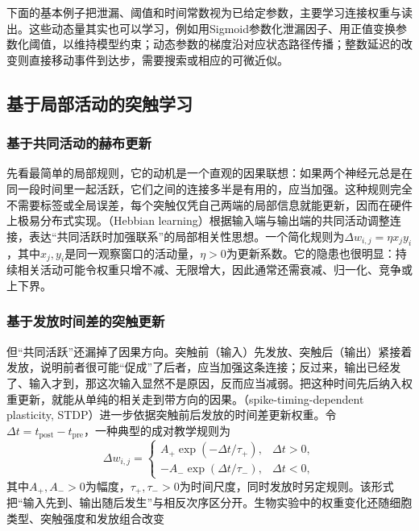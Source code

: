 下面的基本例子把泄漏、阈值和时间常数视为已给定参数，主要学习连接权重与读出。这些动态量其实也可以学习，例如用Sigmoid参数化泄漏因子、用正值变换参数化阈值，以维持模型约束；动态参数的梯度沿对应状态路径传播；整数延迟的改变则直接移动事件到达步，需要搜索或相应的可微近似。

\subsection{基于局部活动的突触学习}
\label{sec:snn-plasticity}

\subsubsection{基于共同活动的赫布更新}
\label{sec:snn-hebb-learning}

先看最简单的局部规则，它的动机是一个直观的因果联想：如果两个神经元总是在同一段时间里一起活跃，它们之间的连接多半是有用的，应当加强。这种规则完全不需要标签或全局误差，每个突触仅凭自己两端的局部信息就能更新，因而在硬件上极易分布式实现。（Hebbian learning）根据输入端与输出端的共同活动调整连接，表达“共同活跃时加强联系”的局部相关性思想。一个简化规则为$\Delta w_{i,j}=\eta x_jy_i$，其中$x_j,y_i$是同一观察窗口的活动量，$\eta>0$为更新系数。它的隐患也很明显：持续相关活动可能令权重只增不减、无限增大，因此通常还需衰减、归一化、竞争或上下界。

\subsubsection{基于发放时间差的突触更新}
\label{sec:snn-stdp-learning}

但“共同活跃”还漏掉了因果方向。突触前（输入）先发放、突触后（输出）紧接着发放，说明前者很可能“促成”了后者，应当加强这条连接；反过来，输出已经发了、输入才到，那这次输入显然不是原因，反而应当减弱。把这种时间先后纳入权重更新，就能从单纯的相关走到带方向的因果。（spike-timing-dependent plasticity, STDP）进一步依据突触前后发放的时间差更新权重。令$\Delta t=t_{\mathrm{post}}-t_{\mathrm{pre}}$，一种典型的成对教学规则为
\begin{equation}
  \Delta w_{i,j}=\begin{cases}
    A_+\exp(-\Delta t/\tau_+),&\Delta t>0,\\
    -A_-\exp(\Delta t/\tau_-),&\Delta t<0,
  \end{cases}
  \label{eq:snn-stdp}
\end{equation}
其中$A_+,A_->0$为幅度，$\tau_+,\tau_->0$为时间尺度，同时发放时另定规则。该形式把“输入先到、输出随后发生”与相反次序区分开。生物实验中的权重变化还随细胞类型、突触强度和发放组合改变


